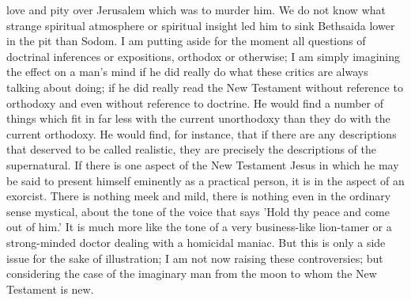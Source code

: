 love and pity over Jerusalem which was to murder him. We do not know what strange spiritual atmosphere or spiritual insight led him to sink Bethsaida lower in the pit than Sodom. I am putting aside for the moment all questions of doctrinal inferences or expositions, orthodox or otherwise; I am simply imagining the effect on a man's mind if he did really do what these critics are always talking about doing; if he did really read the New Testament without reference to orthodoxy and even without reference to doctrine. He would find a number of things which fit in far less with the current unorthodoxy than they do with the current orthodoxy. He would find, for instance, that if there are any descriptions that deserved to be called realistic, they are precisely the descriptions of the supernatural. If there is one aspect of the New Testament Jesus in which he may be said to present himself eminently as a practical person, it is in the aspect of an exorcist. There is nothing meek and mild, there is nothing even in the ordinary sense mystical, about the tone of the voice that says 'Hold thy peace and come out of him.' It is much more like the tone of a very business-like lion-tamer or a strong-minded doctor dealing with a homicidal maniac. But this is only a side issue for the sake of illustration; I am not now raising these controversies; but considering the case of the imaginary man from the moon to whom the New Testament is new.

